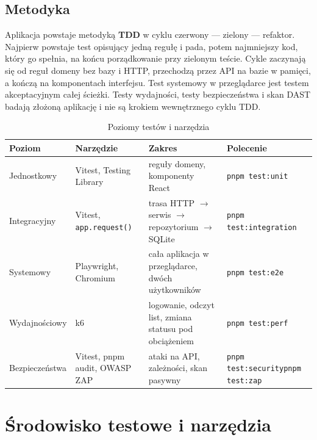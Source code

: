 \documentclass[a4paper,11pt]{article}
\newcommand{\code}[1]{\texttt{\small #1}}
\begin{document}
\subsection{Metodyka}
Aplikacja powstaje metodyką \textbf{TDD} w cyklu czerwony — zielony — refaktor. Najpierw
powstaje test opisujący jedną regułę i pada, potem najmniejszy kod, który go spełnia, na
końcu porządkowanie przy zielonym teście. Cykle zaczynają się od reguł domeny bez bazy i HTTP,
przechodzą przez API na bazie w pamięci, a kończą na komponentach interfejsu. Test systemowy
w przeglądarce jest testem akceptacyjnym całej ścieżki. Testy wydajności, testy bezpieczeństwa
i skan DAST badają złożoną aplikację i nie są krokiem wewnętrznego cyklu TDD.

\begin{table}[H]
\centering\small
\begin{tabularx}{\textwidth}{@{}l >{\raggedright\arraybackslash}p{3.1cm} L >{\raggedright\arraybackslash}p{4.3cm}@{}}
\toprule
\textsf{\textbf{Poziom}} & \textsf{\textbf{Narzędzie}} & \textsf{\textbf{Zakres}} & \textsf{\textbf{Polecenie}}\\
\midrule
Jednostkowy & Vitest, Testing Library & reguły domeny, komponenty React & \code{pnpm test:unit}\\
Integracyjny & Vitest, \code{app.request()} & trasa HTTP $\rightarrow$ serwis $\rightarrow$ repozytorium $\rightarrow$ SQLite & \code{pnpm test:integration}\\
Systemowy & Playwright, Chromium & cała aplikacja w przeglądarce, dwóch użytkowników & \code{pnpm test:e2e}\\
Wydajnościowy & k6 & logowanie, odczyt list, zmiana statusu pod obciążeniem & \code{pnpm test:perf}\\
Bezpieczeństwa & Vitest, pnpm audit, OWASP ZAP & ataki na API, zależności, skan pasywny & \code{pnpm test:security}\newline\code{pnpm test:zap}\\
\bottomrule
\end{tabularx}
\caption{Poziomy testów i narzędzia}
\end{table}

\section{Środowisko testowe i narzędzia}
\end{document}
